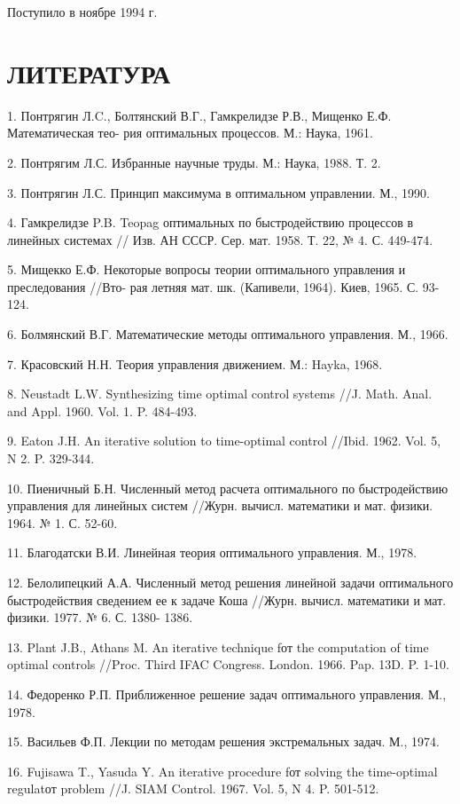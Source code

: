\documentclass[10pt]{article}
\begin{document}
Поступило в ноябре 1994 г.

\section*{ЛИТЕРАТУРА}

1. Понтрягин Л.C., Болтянский В.Г., Гамкрелидзе Р.В., Мищенко Е.Ф. Математическая тео- рия оптимальных процессов. М.: Наука, 1961.

2. Понтрягим Л.С. Избранные научные труды. М.: Наука, 1988. Т. 2.

3. Понтрягин Л.С. Принцип максимума в оптимальном управлении. М., 1990.

4. Гамкрелидзе P.B. Teopag оптимальных по быстродействию процессов в линейных системах // Изв. АН СССР. Сер. мат. 1958. Т. 22, № 4. С. 449-474.

5. Мищекко Е.Ф. Некоторые вопросы теории оптимального управления и преследования //Вто- рая летняя мат. шк. (Капивели, 1964). Киев, 1965. С. 93-124.

6. Болмянский В.Г. Математические методы оптимального управления. М., 1966.

7. Красовский Н.Н. Теория управления движением. М.: Hayka, 1968.

8. Neustadt L.W. Synthesizing time optimal control systems //J. Math. Anal. and Appl. 1960. Vol. 1. P. 484-493.

9. Eaton J.H. An iterative solution to time-optimal control //Ibid. 1962. Vol. 5, N 2. P. 329-344.

10. Пиеничный Б.Н. Численный метод расчета оптимального по быстродействию управления для линейных систем //Журн. вычисл. математики и мат. физики. 1964. № 1. С. 52-60.

11. Благодатски В.И. Линейная теория оптимального управления. М., 1978.

12. Белолипецкий А.А. Численный метод решения линейной задачи оптимального быстродействия сведением ее к задаче Коша //Журн. вычисл. математики и мат. физики. 1977. № 6. С. 1380- 1386.

13. Plant J.B., Athans M. An iterative technique fот the computation of time optimal controls //Proc. Third IFAC Congress. London. 1966. Pap. 13D. P. 1-10.

14. Федоренко Р.П. Приближенное решение задач оптимального управления. М., 1978.

15. Васильев Ф.П. Лекции по методам решения экстремальных задач. М., 1974.

16. Fujisawa T., Yasuda Y. An iterative procedure fот solving the time-optimal regulatот problem //J. SIAM Control. 1967. Vol. 5, N 4. P. 501-512.
\end{document}
